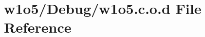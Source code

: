 \hypertarget{w1o5_8c_8o_8d}{}\section{w1o5/\+Debug/w1o5.c.\+o.\+d File Reference}
\label{w1o5_8c_8o_8d}
